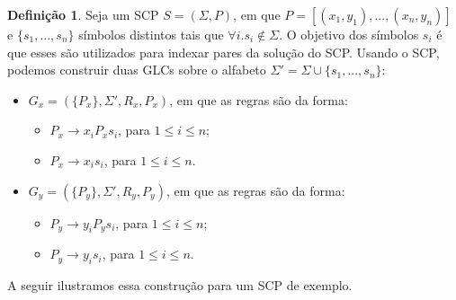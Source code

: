 \documentclass[a4paper]{article}
\theoremstyle{definition}
\newtheorem{Definition}{Definição}
\begin{document}
  
  \begin{Definition}
    Seja um SCP $S = (\Sigma, P)$, em que $P = [(x_1,y_1),...,(x_n,y_n)]$ e
    $\{s_1,...,s_n\}$ símbolos distintos tais que $\forall i. s_i\not\in\Sigma$.
    O objetivo dos símbolos $s_i$ é que esses são utilizados para indexar pares
    da solução do SCP. Usando o SCP, podemos construir duas GLCs sobre o
    alfabeto $\Sigma' = \Sigma\cup\{s_1,...,s_n\}$:
    \begin{itemize}
       \item $G_x=(\{P_x\},\Sigma', R_x, P_x)$, em que as regras são da forma:
         \begin{itemize}
           \item $P_x \to x_iP_x s_i$, para $1 \leq i \leq n$;
           \item $P_x \to x_is_i$, para $1 \leq i \leq n$.
           \end{itemize}
       \item $G_y=(\{P_y\},\Sigma', R_y, P_y)$, em que as regras são da forma:
         \begin{itemize}
           \item $P_y \to y_iP_y s_i$, para $1 \leq i \leq n$;
           \item $P_y \to y_is_i$, para $1 \leq i \leq n$.
         \end{itemize}
    \end{itemize}
  \end{Definition}

  A seguir ilustramos essa construção para um SCP de exemplo.
\end{document}
